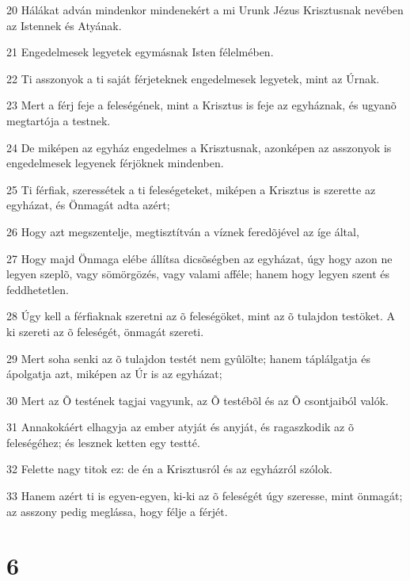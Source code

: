 \par 20 Hálákat adván mindenkor mindenekért a mi Urunk Jézus Krisztusnak nevében az Istennek és Atyának.
\par 21 Engedelmesek legyetek egymásnak Isten félelmében.
\par 22 Ti asszonyok a ti saját férjeteknek engedelmesek legyetek, mint az Úrnak.
\par 23 Mert a férj feje a feleségének, mint a Krisztus is feje az egyháznak, és ugyanõ megtartója a testnek.
\par 24 De miképen az egyház engedelmes a Krisztusnak, azonképen az asszonyok is engedelmesek legyenek férjöknek mindenben.
\par 25 Ti férfiak, szeressétek a ti feleségeteket, miképen a Krisztus is szerette az egyházat, és Önmagát adta azért;
\par 26 Hogy azt megszentelje, megtisztítván a víznek feredõjével az íge által,
\par 27 Hogy majd Önmaga elébe állítsa dicsõségben az egyházat, úgy hogy azon ne legyen szeplõ, vagy sömörgözés, vagy valami afféle; hanem hogy legyen szent és feddhetetlen.
\par 28 Úgy kell a férfiaknak szeretni az õ feleségöket, mint az õ tulajdon testöket. A ki szereti az õ feleségét, önmagát szereti.
\par 29 Mert soha senki az õ tulajdon testét nem gyûlölte; hanem táplálgatja és ápolgatja azt, miképen az Úr is az egyházat;
\par 30 Mert az Õ testének tagjai vagyunk, az Õ testébõl és az Õ csontjaiból valók.
\par 31 Annakokáért elhagyja az ember atyját és anyját, és ragaszkodik az õ feleségéhez; és lesznek ketten egy testté.
\par 32 Felette nagy titok ez: de én a Krisztusról és az egyházról szólok.
\par 33 Hanem azért ti is egyen-egyen, ki-ki az õ feleségét úgy szeresse, mint önmagát; az asszony pedig meglássa, hogy félje a férjét.

\chapter{6}


